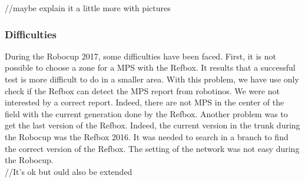 //maybe explain it a little more with pictures



\subsubsection{Difficulties}

During the Robocup 2017, some difficulties have been faced. First, it is not possible to choose a zone for a MPS with the Refbox. It results that a successful test is more difficult to do in a smaller area. With this problem, we have use only check if the Refbox can detect the MPS report from robotinos. We were not interested by a correct report. Indeed, there are not MPS in the center of the field with the current generation done by the Refbox. Another problem was to get the last version of the Refbox. Indeed, the current version in the trunk during the Robocup was the Refbox 2016. It was needed to search in a branch to find the correct version of the Refbox. The setting of the network was not easy during the Robocup. \\

//It's ok but ould also be extended
